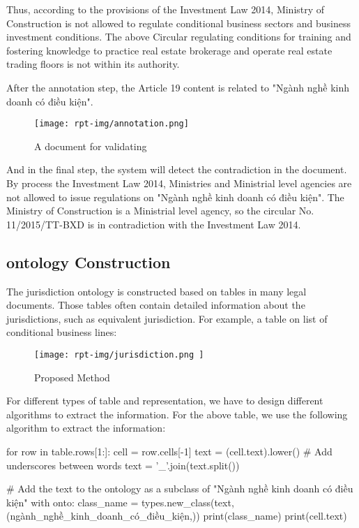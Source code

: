 Thus, according to the provisions of the Investment Law 2014, Ministry of Construction is not allowed to regulate conditional business sectors and business investment conditions. The above Circular regulating conditions for training and fostering knowledge to practice real estate brokerage and operate real estate trading floors is not within its authority.

After the annotation step, the Article 19 content is related to "Ngành nghề kinh doanh có điều kiện".

\begin{figure}[H]
    \centering
    \texttt{[image: rpt-img/annotation.png]}
    \caption{A document for validating}
    \label{fig:docex}
    \end{figure}

And in the final step, the system will detect the contradiction in the document. By process the Investment Law 2014, Ministries and Ministrial level agencies are not allowed to issue regulations on "Ngành nghề kinh doanh có điều kiện". The Ministry of Construction is a Ministrial level agency, so the circular No. 11/2015/TT-BXD is in contradiction with the Investment Law 2014.

\subsection{ontology Construction}

The jurisdiction ontology is constructed based on tables in many legal documents. Those tables often contain detailed information about the jurisdictions, such as equivalent jurisdiction. For example, a table on list of conditional business lines:

\begin{figure}[H]
    \centering
    \texttt{[image: rpt-img/jurisdiction.png     ]}
    \caption{Proposed Method}
    \label{fig:proposedmethod}
\end{figure}

For different types of table and representation, we have to design different algorithms to extract the information. For the above table, we use the following algorithm to extract the information:

for row in table.rows[1:]:
	cell = row.cells[-1]
	text = (cell.text).lower()
	# Add underscores between words
	text = '_'.join(text.split())

	# Add the text to the ontology as a subclass of "Ngành nghề kinh doanh có điều kiện"
	with onto:
		class_name = types.new_class(text, (ngành_nghề_kinh_doanh_có_điều_kiện,))
		print(class_name)
	print(cell.text)

